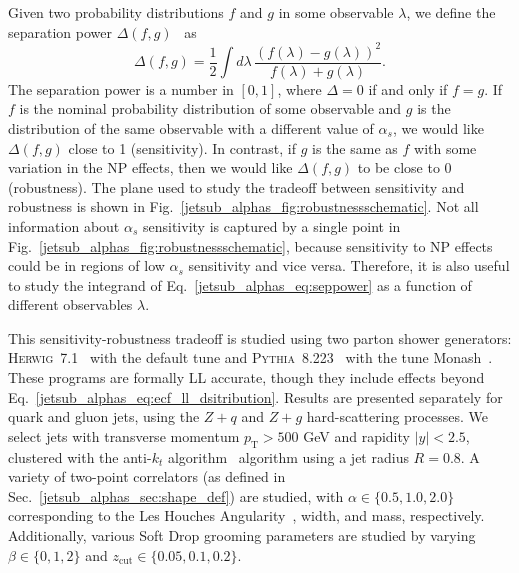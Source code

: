 \documentclass[11pt]{cernrep}
\begin{document}
Given two probability distributions $f$ and $g$ in some observable $\lambda$, we define the separation power $\Delta(f,g)$~\cite{Harrison:1998yr} as
%
\begin{equation}
\label{jetsub_alphas_eq:seppower}
\Delta(f,g)=\frac{1}{2}\int d\lambda \, \frac{(f(\lambda)-g(\lambda))^2}{f(\lambda)+g(\lambda)}.
\end{equation}
%
The separation power is a number in $[0,1]$, where $\Delta=0$ if and only if $f=g$.
%
If $f$ is the nominal probability distribution of some observable and $g$ is the distribution of the same observable with a different value of $\alpha_s$, we would like $\Delta(f,g)$ close to 1 (sensitivity).
%
In contrast, if $g$ is the same as $f$ with some variation in the NP effects, then we would like $\Delta(f,g)$ to be close to $0$ (robustness).
%
The plane used to study the tradeoff between sensitivity and robustness is shown in Fig.~\ref{jetsub_alphas_fig:robustnessschematic}.
%
Not all information about $\alpha_s$ sensitivity is captured by a single point in Fig.~\ref{jetsub_alphas_fig:robustnessschematic}, because sensitivity to NP effects could be in regions of low $\alpha_s$ sensitivity and vice versa.
%
Therefore, it is also useful to study the integrand of Eq.~\ref{jetsub_alphas_eq:seppower} as a function of different observables $\lambda$.


This sensitivity-robustness tradeoff is studied using two parton shower generators: \textsc{Herwig~7}.1~\cite{Bellm:2015jjp,Reichelt:2017hts} with the default tune and \textsc{Pythia~8}.223~\cite{Sjostrand:2006za,Sjostrand:2014zea} with the tune Monash~\cite{Skands:2014pea}.  %
%
These programs are formally LL accurate, though they include effects beyond Eq.~\ref{jetsub_alphas_eq:ecf_ll_dsitribution}.
%
Results are presented separately for quark and gluon jets, using the $Z+q$ and $Z+g$ hard-scattering processes.
%
We select jets with transverse momentum $p_\mathrm{T}>500$ GeV and rapidity $|y|<2.5$, clustered with the anti-$k_t$ algorithm~\cite{Cacciari:2008gp} algorithm using a jet radius $R=0.8$.
%
A variety of two-point correlators (as defined in Sec.~\ref{jetsub_alphas_sec:shape_def}) are studied, with $\alpha\in\{0.5,1.0, 2.0\}$ corresponding to the Les Houches Angularity~\cite{Gras:2017jty}, width, and mass, respectively. 
%
Additionally, various Soft Drop grooming parameters are studied by varying $\beta\in\{0,1,2\}$ and $z_\mathrm{cut}\in \{0.05,0.1,0.2\}$.  
\end{document}
